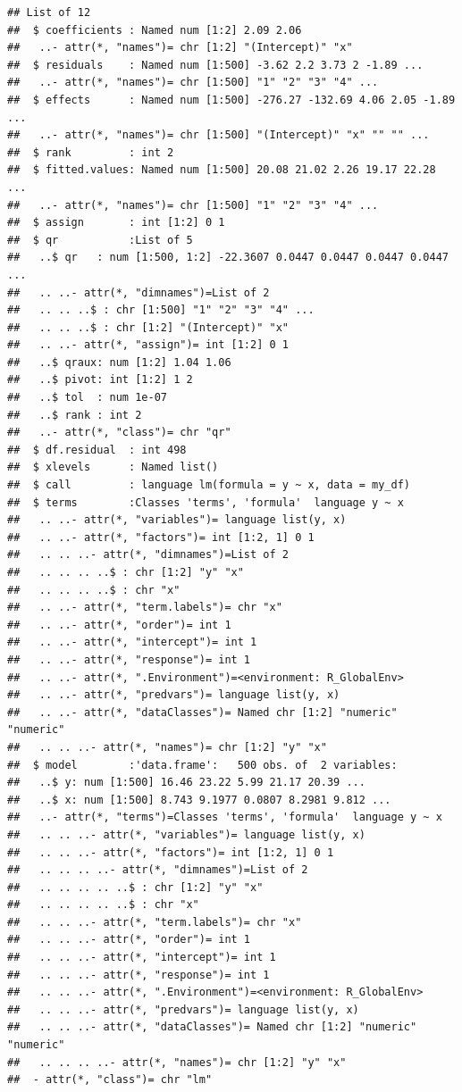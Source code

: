 \documentclass[]{book}
\theoremstyle{definition}
\theoremstyle{definition}
\theoremstyle{definition}
\theoremstyle{remark}
\begin{document}
\begin{verbatim}
## List of 12
##  $ coefficients : Named num [1:2] 2.09 2.06
##   ..- attr(*, "names")= chr [1:2] "(Intercept)" "x"
##  $ residuals    : Named num [1:500] -3.62 2.2 3.73 2 -1.89 ...
##   ..- attr(*, "names")= chr [1:500] "1" "2" "3" "4" ...
##  $ effects      : Named num [1:500] -276.27 -132.69 4.06 2.05 -1.89 ...
##   ..- attr(*, "names")= chr [1:500] "(Intercept)" "x" "" "" ...
##  $ rank         : int 2
##  $ fitted.values: Named num [1:500] 20.08 21.02 2.26 19.17 22.28 ...
##   ..- attr(*, "names")= chr [1:500] "1" "2" "3" "4" ...
##  $ assign       : int [1:2] 0 1
##  $ qr           :List of 5
##   ..$ qr   : num [1:500, 1:2] -22.3607 0.0447 0.0447 0.0447 0.0447 ...
##   .. ..- attr(*, "dimnames")=List of 2
##   .. .. ..$ : chr [1:500] "1" "2" "3" "4" ...
##   .. .. ..$ : chr [1:2] "(Intercept)" "x"
##   .. ..- attr(*, "assign")= int [1:2] 0 1
##   ..$ qraux: num [1:2] 1.04 1.06
##   ..$ pivot: int [1:2] 1 2
##   ..$ tol  : num 1e-07
##   ..$ rank : int 2
##   ..- attr(*, "class")= chr "qr"
##  $ df.residual  : int 498
##  $ xlevels      : Named list()
##  $ call         : language lm(formula = y ~ x, data = my_df)
##  $ terms        :Classes 'terms', 'formula'  language y ~ x
##   .. ..- attr(*, "variables")= language list(y, x)
##   .. ..- attr(*, "factors")= int [1:2, 1] 0 1
##   .. .. ..- attr(*, "dimnames")=List of 2
##   .. .. .. ..$ : chr [1:2] "y" "x"
##   .. .. .. ..$ : chr "x"
##   .. ..- attr(*, "term.labels")= chr "x"
##   .. ..- attr(*, "order")= int 1
##   .. ..- attr(*, "intercept")= int 1
##   .. ..- attr(*, "response")= int 1
##   .. ..- attr(*, ".Environment")=<environment: R_GlobalEnv> 
##   .. ..- attr(*, "predvars")= language list(y, x)
##   .. ..- attr(*, "dataClasses")= Named chr [1:2] "numeric" "numeric"
##   .. .. ..- attr(*, "names")= chr [1:2] "y" "x"
##  $ model        :'data.frame':   500 obs. of  2 variables:
##   ..$ y: num [1:500] 16.46 23.22 5.99 21.17 20.39 ...
##   ..$ x: num [1:500] 8.743 9.1977 0.0807 8.2981 9.812 ...
##   ..- attr(*, "terms")=Classes 'terms', 'formula'  language y ~ x
##   .. .. ..- attr(*, "variables")= language list(y, x)
##   .. .. ..- attr(*, "factors")= int [1:2, 1] 0 1
##   .. .. .. ..- attr(*, "dimnames")=List of 2
##   .. .. .. .. ..$ : chr [1:2] "y" "x"
##   .. .. .. .. ..$ : chr "x"
##   .. .. ..- attr(*, "term.labels")= chr "x"
##   .. .. ..- attr(*, "order")= int 1
##   .. .. ..- attr(*, "intercept")= int 1
##   .. .. ..- attr(*, "response")= int 1
##   .. .. ..- attr(*, ".Environment")=<environment: R_GlobalEnv> 
##   .. .. ..- attr(*, "predvars")= language list(y, x)
##   .. .. ..- attr(*, "dataClasses")= Named chr [1:2] "numeric" "numeric"
##   .. .. .. ..- attr(*, "names")= chr [1:2] "y" "x"
##  - attr(*, "class")= chr "lm"
\end{verbatim}
\end{document}
